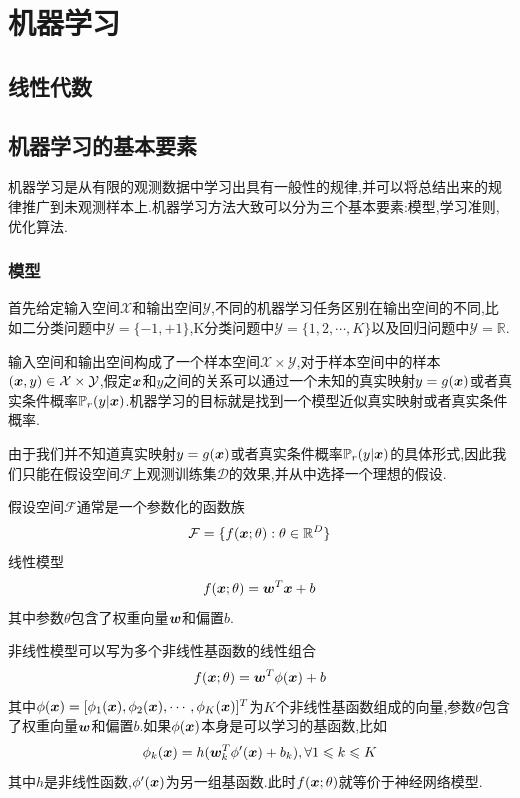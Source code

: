 \newpage
\section{机器学习}
\subsection{线性代数}
\subsection{机器学习的基本要素}
机器学习是从有限的观测数据中学习出具有一般性的规律,并可以将总结出来的规律推广到未观测样本上.机器学习方法大致可以分为三个基本要素:模型,学习准则,优化算法.
\subsubsection{模型}
首先给定输入空间$\mathcal{X}$和输出空间$\mathcal{Y}$,不同的机器学习任务区别在输出空间的不同,比如二分类问题中$\mathcal{Y}=\{-1,+1\}$,K分类问题中$\mathcal{Y}=\{1,2,\cdots,K\}$以及回归问题中$\mathcal{Y}=\mathbb{R}$.\par
输入空间和输出空间构成了一个样本空间$\mathcal{X}\times\mathcal{Y}$,对于样本空间中的样本$(\bm{x},y)\in \mathcal{X}\times\mathcal{Y}$,假定$\bm{x}$和$y$之间的关系可以通过一个未知的真实映射$y=g(\bm{x})$或者真实条件概率$\mathbb{P}_r(y|\bm{x})$.机器学习的目标就是找到一个模型近似真实映射或者真实条件概率.\par
由于我们并不知道真实映射$y=g(\bm{x})$或者真实条件概率$\mathbb{P}_r(y|\bm{x})$的具体形式,因此我们只能在假设空间$\mathcal{F}$上观测训练集$\mathcal{D}$的效果,并从中选择一个理想的假设.\par
假设空间$\mathcal{F}$通常是一个参数化的函数族
$$
\mathcal{F}=\{f(\bm{x};\theta):\theta\in\mathbb{R}^{D}\}
$$
\qquad 线性模型
$$
f(\bm{x};\theta)=\bm{w}^T\bm{x}+b
$$
其中参数$\theta$包含了权重向量$\bm{w}$和偏置$b$.\par
非线性模型可以写为多个非线性基函数的线性组合
$$
f(\bm{x};\theta)=\bm{w}^T\phi(\bm{x})+b
$$
其中$\phi(\bm{x})=[\phi_1(\bm{x}),\phi_2(\bm{x}),\cdots,\phi_K(\bm{x})]^T$为$K$个非线性基函数组成的向量,参数$\theta$包含了权重向量$\bm{w}$和偏置$b$.如果$\phi(\bm{x})$本身是可以学习的基函数,比如
$$
\phi_k(\bm{x})=h(\bm{w}_k^T\phi'(\bm{x})+b_k),\forall 1\leqslant k\leqslant K
$$
其中$h$是非线性函数,$\phi'(\bm{x})$为另一组基函数.此时$f(\bm{x};\theta)$就等价于神经网络模型.
